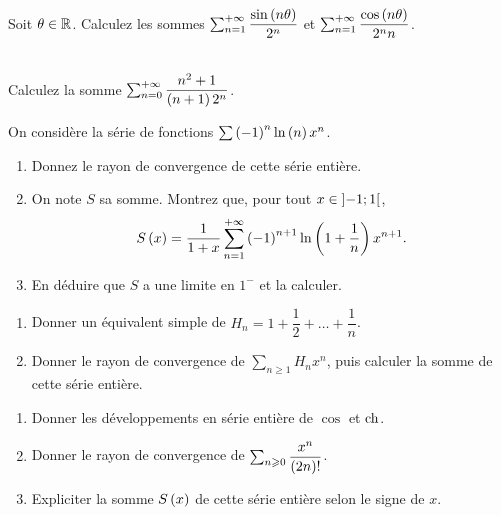 \begin{exoss}
Soit \(\theta\in\mathbb{R}\). Calculez les sommes \(\sum_{n=1}^{+\infty}\dfrac{\sin\left(n\theta\right)}{2^n}\) et \(\sum_{n=1}^{+\infty}\dfrac{\cos\left(n\theta\right)}{2^nn}\).
\end{exoss}

\begin{exoss}~\\
Calculez la somme \(\sum_{n=0}^{+\infty}\dfrac{n^2+1}{\left(n+1\right)2^n}\).
\end{exoss}

\begin{exoss}
On considère la série de fonctions \(\sum\left(-1\right)^n\ln\left(n\right)x^n\).

\begin{enumerate}
    \item Donnez le rayon de convergence de cette série entière. \\
    \item On note \(S\) sa somme. Montrez que, pour tout \(x\in\left]-1;1\right[\), \[S\left(x\right)=\dfrac{1}{1+x}\sum_{n=1}^{+\infty}\left(-1\right)^{n+1}\ln\left(1+\dfrac{1}{n}\right)x^{n+1}.\]
    \item En déduire que \(S\) a une limite en \(1^-\) et la calculer.
\end{enumerate}
\end{exoss}

\begin{exo}
\begin{enumerate}
    \item Donner un équivalent simple de \(H_n=1+\dfrac{1}{2}+\dots+\dfrac{1}{n}\). \\
    \item Donner le rayon de convergence de \(\sum_{n\geq1}H_nx^n\), puis calculer la somme de cette série entière.
\end{enumerate}
\end{exo}

\begin{exo}
\begin{enumerate}
    \item Donner les développements en série entière de \(\cos\) et \(\operatorname{ch}\). \\
    \item Donner le rayon de convergence de \(\sum_{n\geqslant0}\dfrac{x^n}{\left(2n\right)!}\). \\
    \item Expliciter la somme \(S\left(x\right)\) de cette série entière selon le signe de \(x\).
\end{enumerate}
\end{exo}

